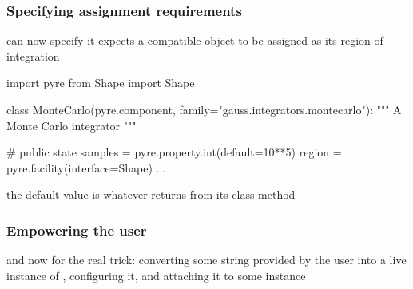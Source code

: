 \begin{frame}[fragile]
%
  \frametitle{Specifying assignment requirements}
%
   can now specify it expects a  compatible object to be
  assigned as its region of integration
%
  \begin{ipython}{}
import pyre
from Shape import Shape

class MonteCarlo(pyre.component, family="gauss.integrators.montecarlo"):
    """
    A Monte Carlo integrator
    """

    # public state
    samples = pyre.property.int(default=10**5)
    region = pyre.facility(interface=Shape)
    ...
  \end{ipython}
%
  the default value is whatever  returns from its  class
  method
%
\end{frame}

\begin{frame}[fragile]
%
  \frametitle{Empowering the user}
%
  and now for the real trick: converting some string provided by the user into a live instance
  of , configuring it, and attaching it to some  instance
%
\end{frame}

